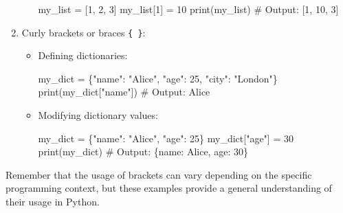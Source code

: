 \documentclass[
  letterpaper,
  DIV=11,
  numbers=noendperiod]{scrreprt}
\newenvironment{Shaded}{\begin{snugshade}}{\end{snugshade}}
\newcommand{\BuiltInTok}[1]{\textcolor[rgb]{0.00,0.23,0.31}{#1}}
\newcommand{\CommentTok}[1]{\textcolor[rgb]{0.37,0.37,0.37}{#1}}
\newcommand{\DecValTok}[1]{\textcolor[rgb]{0.68,0.00,0.00}{#1}}
\newcommand{\NormalTok}[1]{\textcolor[rgb]{0.00,0.23,0.31}{#1}}
\newcommand{\OperatorTok}[1]{\textcolor[rgb]{0.37,0.37,0.37}{#1}}
\newcommand{\StringTok}[1]{\textcolor[rgb]{0.13,0.47,0.30}{#1}}
\begin{document}
\begin{enumerate}
\begin{itemize}
\begin{Shaded}
\begin{Highlighting}[]
\NormalTok{my\_list }\OperatorTok{=}\NormalTok{ [}\DecValTok{1}\NormalTok{, }\DecValTok{2}\NormalTok{, }\DecValTok{3}\NormalTok{]}
\NormalTok{my\_list[}\DecValTok{1}\NormalTok{] }\OperatorTok{=} \DecValTok{10}
\BuiltInTok{print}\NormalTok{(my\_list)         }
\CommentTok{\# Output: [1, 10, 3]}
\end{Highlighting}
\end{Shaded}
  \end{itemize}
\item
  Curly brackets or braces \texttt{\{\ \}}:

  \begin{itemize}
  \item
    Defining dictionaries:

\begin{Shaded}
\begin{Highlighting}[]
\NormalTok{my\_dict }\OperatorTok{=}\NormalTok{ \{}\StringTok{"name"}\NormalTok{: }\StringTok{"Alice"}\NormalTok{, }\StringTok{"age"}\NormalTok{: }\DecValTok{25}\NormalTok{, }\StringTok{"city"}\NormalTok{: }\StringTok{"London"}\NormalTok{\}}
\BuiltInTok{print}\NormalTok{(my\_dict[}\StringTok{"name"}\NormalTok{])    }
\CommentTok{\# Output: Alice}
\end{Highlighting}
\end{Shaded}
  \item
    Modifying dictionary values:

\begin{Shaded}
\begin{Highlighting}[]
\NormalTok{my\_dict }\OperatorTok{=}\NormalTok{ \{}\StringTok{"name"}\NormalTok{: }\StringTok{"Alice"}\NormalTok{, }\StringTok{"age"}\NormalTok{: }\DecValTok{25}\NormalTok{\}}
\NormalTok{my\_dict[}\StringTok{"age"}\NormalTok{] }\OperatorTok{=} \DecValTok{30}
\BuiltInTok{print}\NormalTok{(my\_dict)            }
\CommentTok{\# Output: \{\textquotesingle{}name\textquotesingle{}: \textquotesingle{}Alice\textquotesingle{}, \textquotesingle{}age\textquotesingle{}: 30\}}
\end{Highlighting}
\end{Shaded}
  \end{itemize}
\end{enumerate}

Remember that the usage of brackets can vary depending on the specific
programming context, but these examples provide a general understanding
of their usage in Python.
\end{document}
